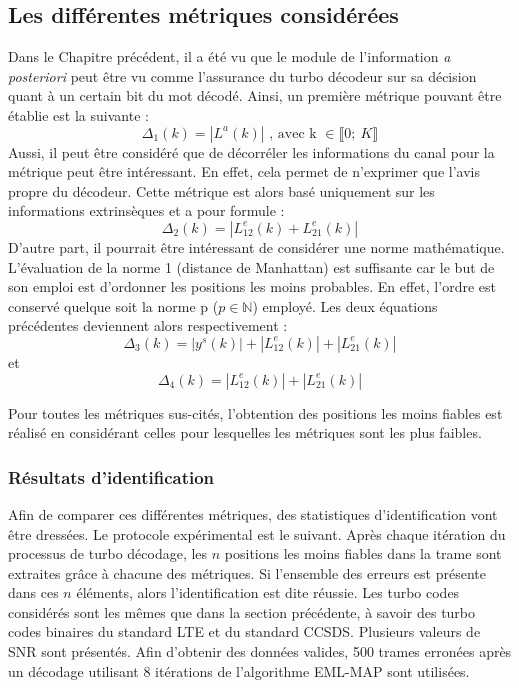 \subsection{Les différentes métriques considérées}
Dans le Chapitre précédent, il a été vu que le module de l'information \textit{a posteriori} peut être vu comme 
l'assurance du turbo décodeur sur sa décision quant à un certain bit du mot décodé. Ainsi, un première métrique pouvant 
être établie est la suivante :
\begin{equation}
	\Delta_1(k) = |L^a(k)|\text{~, avec k~}\in \llbracket0;~K \rrbracket 
\end{equation}
Aussi, il peut être considéré que de décorréler les informations du canal pour la métrique peut être intéressant. En effet, 
cela permet de n'exprimer que l'avis propre du décodeur. Cette métrique est alors basé uniquement sur les informations extrinsèques et a pour formule : 
\begin{equation}
	\Delta_2(k) = |L^e_{12}(k)+L^e_{21}(k)|
\end{equation}
D'autre part, il pourrait être intéressant de considérer une norme mathématique. L'évaluation de la norme 1 (distance de
Manhattan) est suffisante car le but de son emploi est d'ordonner les positions les moins probables. En effet, l'ordre est 
conservé quelque soit la norme p ($p \in \mathbb{N} $) employé. Les deux équations précédentes deviennent alors respectivement :
\begin{equation}
	\Delta_3(k) = |y^s(k)| + |L^e_{12}(k)| + |L^e_{21}(k)|
\end{equation}
et 
\begin{equation}
	\Delta_4(k) = |L^e_{12}(k)| + |L^e_{21}(k)|
\end{equation}

Pour toutes les métriques sus-cités, l'obtention des positions les moins fiables est réalisé en considérant celles pour 
lesquelles les métriques sont les plus faibles.

\subsubsection{Résultats d'identification}
Afin de comparer ces différentes métriques, des statistiques d'identification vont être dressées. Le protocole 
expérimental est le suivant. Après chaque itération du processus de turbo décodage, les $n$ positions les moins fiables
dans la trame sont extraites grâce à chacune des métriques. Si l'ensemble des erreurs est présente dans ces $n$ éléments,
alors l'identification est dite réussie. Les turbo codes considérés sont les mêmes que dans la section précédente, à 
savoir des turbo codes binaires du standard LTE et du standard CCSDS. Plusieurs valeurs de SNR sont présentés. Afin 
d'obtenir des données valides, 500 trames erronées après un décodage utilisant 8 itérations de l'algorithme EML-MAP sont
utilisées.


